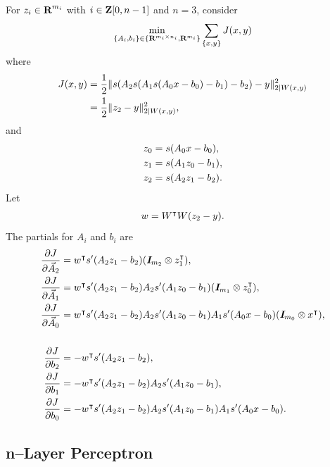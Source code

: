 \documentclass{article}
\begin{document}
    For $z_i\in\textbf{R}^{m_i}$ with $i\in\textbf{Z}[0,n-1]$ and $n=3$, consider
    \begin{align*}
        \min_{\{A_i,b_i\}\in\{\textbf{R}^{m_i\times n_i},\textbf{R}^{m_i}\}}\sum_{\{x,y\}}
        J (x,y)
    \end{align*}
    where
    \begin{align*}
        J(x,y)&=\frac{1}{2}\|s(A_2s(A_1s(A_0x-b_0)-b_1)-b_2)-y \|_{2|W(x,y)}^2\\
        &=\frac{1}{2}\|z_2-y \|_{2|W(x,y)}^2,
    \end{align*}
    and
    \begin{align*}
        z_0&=s(A_0x-b_0),\\
        z_1&=s(A_1z_0-b_1),\\
        z_2&=s(A_2z_1-b_2).
    \end{align*}
    Let
    \begin{align*}
        w=W^\intercal W(z_2-y ).
    \end{align*}
    The partials for $A_i$ and $b_i$ are
    \begin{align*}
        \frac{\partial  J }{\partial \vec{A}_2}&=w^\intercal  s'(A_2z_1 -b_2)(\emph{\textbf{I}}_{m_2}\otimes z_1^\intercal),\\
        \frac{\partial  J }{\partial \vec{A}_1}&=w^\intercal  s'(A_2z_1 -b_2)A_2s'(A_1z_0 -b_1)(\emph{\textbf{I}}_{m_1}\otimes z_0^\intercal),\\
        \frac{\partial  J }{\partial \vec{A}_0}&=w^\intercal  s'(A_2z_1 -b_2)A_2s'(A_1z_0 -b_1)A_1s'(A_0x -b_0)( \emph{\textbf{I}}_{m_0} \otimes x ^\intercal),\\
        \\
        \frac{\partial  J }{\partial b_2}&=-w^\intercal  s'(A_2z_1 -b_2),\\
        \frac{\partial  J }{\partial b_1}&=-w^\intercal  s'(A_2z_1 -b_2)A_2s'(A_1z_0 -b_1),\\
        \frac{\partial  J }{\partial b_0}&=-w^\intercal  s'(A_2z_1 -b_2)A_2s'(A_1z_0 -b_1)A_1s'(A_0x -b_0).
    \end{align*}
    
    \clearpage
\subsection{n--Layer Perceptron}
\end{document}
